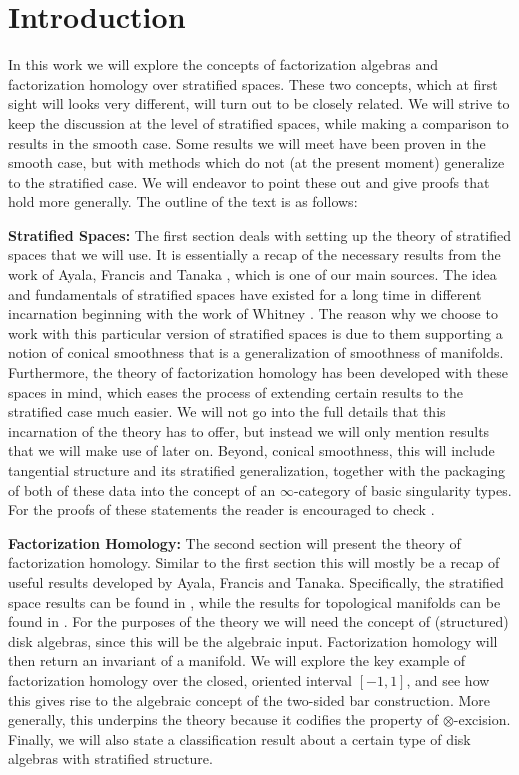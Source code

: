 \documentclass[../text]{subfiles}
\begin{document}
\section{Introduction}

In this work we will explore the concepts of factorization algebras and factorization homology over stratified spaces. These two concepts, which at first sight will looks very different, will turn out to be closely related. We will strive to keep the discussion at the level of stratified spaces, while making a comparison to results in the smooth case. Some results we will meet have been proven in the smooth case, but with methods which do not (at the present moment) generalize to the stratified case. We will endeavor to point these out and give proofs that hold more generally. The outline of the text is as follows:

\textbf{ Stratified Spaces:} The first section deals with setting up the theory of stratified spaces that we will use. It is essentially a recap of the necessary results from the work of Ayala, Francis and Tanaka \cite{aft_localstrut}, which is one of our main sources. The idea and fundamentals of stratified spaces have existed for a long time in different incarnation beginning with the work of Whitney \cite{whitney92}. The reason why we choose to work with this particular version of stratified spaces is due to them supporting a notion of conical smoothness that is a generalization of smoothness of manifolds. Furthermore, the theory of factorization homology has been developed with these spaces in mind, which eases the process of extending certain results to the stratified case much easier. We will not go into the full details that this incarnation of the theory has to offer, but instead we will only mention results that we will make use of later on. Beyond, conical smoothness, this will include tangential structure and its stratified generalization, together with the packaging of both of these data into the concept of an $\infty$-category of basic singularity types. For the proofs of these statements the reader is encouraged to check \cite{aft_localstrut}.

\textbf{ Factorization Homology:} The second section will present the theory of factorization homology. Similar to the first section this will mostly be a recap of useful results developed by Ayala, Francis and Tanaka. Specifically, the stratified space results can be found in \cite{aft_fhstrat}, while the results for topological manifolds can be found in \cite{af_fhtop}. For the purposes of the theory we will need the concept of (structured) disk algebras, since this will be the algebraic input. Factorization homology will then return an invariant of a manifold. We will explore the key example of factorization homology over the closed, oriented interval $[-1,1]$, and see how this gives rise to the algebraic concept of the two-sided bar construction. More generally, this underpins the theory because it codifies the property of $\otimes$-excision. Finally, we will also state a classification result about a certain type of disk algebras with stratified structure.
\end{document}
